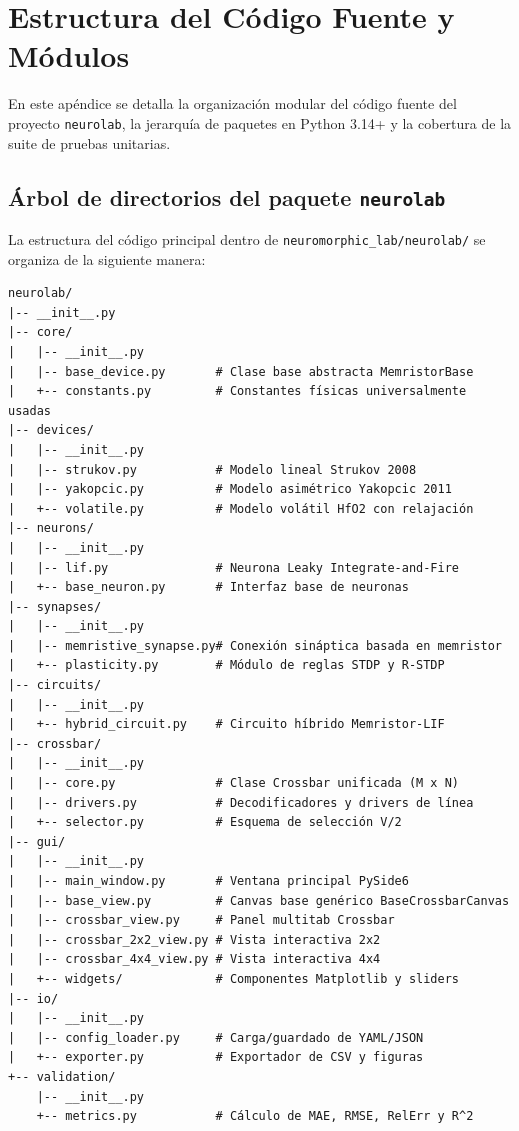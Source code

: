 \chapter{Estructura del Código Fuente y Módulos}
\label{ch:apendice_codigo}
\renewcommand{\thesubsection}{\thesection.\arabic{subsection}}

En este apéndice se detalla la organización modular del código fuente del proyecto \texttt{neurolab}, la jerarquía de paquetes en Python 3.14+ y la cobertura de la suite de pruebas unitarias.

\section{Árbol de directorios del paquete \texttt{neurolab}}
\label{sec:arbol_codigo}

La estructura del código principal dentro de \texttt{neuromorphic\_lab/neurolab/} se organiza de la siguiente manera:

\begin{verbatim}
neurolab/
|-- __init__.py
|-- core/
|   |-- __init__.py
|   |-- base_device.py       # Clase base abstracta MemristorBase
|   +-- constants.py         # Constantes físicas universalmente usadas
|-- devices/
|   |-- __init__.py
|   |-- strukov.py           # Modelo lineal Strukov 2008
|   |-- yakopcic.py          # Modelo asimétrico Yakopcic 2011
|   +-- volatile.py          # Modelo volátil HfO2 con relajación
|-- neurons/
|   |-- __init__.py
|   |-- lif.py               # Neurona Leaky Integrate-and-Fire
|   +-- base_neuron.py       # Interfaz base de neuronas
|-- synapses/
|   |-- __init__.py
|   |-- memristive_synapse.py# Conexión sináptica basada en memristor
|   +-- plasticity.py        # Módulo de reglas STDP y R-STDP
|-- circuits/
|   |-- __init__.py
|   +-- hybrid_circuit.py    # Circuito híbrido Memristor-LIF
|-- crossbar/
|   |-- __init__.py
|   |-- core.py              # Clase Crossbar unificada (M x N)
|   |-- drivers.py           # Decodificadores y drivers de línea
|   +-- selector.py          # Esquema de selección V/2
|-- gui/
|   |-- __init__.py
|   |-- main_window.py       # Ventana principal PySide6
|   |-- base_view.py         # Canvas base genérico BaseCrossbarCanvas
|   |-- crossbar_view.py     # Panel multitab Crossbar
|   |-- crossbar_2x2_view.py # Vista interactiva 2x2
|   |-- crossbar_4x4_view.py # Vista interactiva 4x4
|   +-- widgets/             # Componentes Matplotlib y sliders
|-- io/
|   |-- __init__.py
|   |-- config_loader.py     # Carga/guardado de YAML/JSON
|   +-- exporter.py          # Exportador de CSV y figuras
+-- validation/
    |-- __init__.py
    +-- metrics.py           # Cálculo de MAE, RMSE, RelErr y R^2
\end{verbatim}

